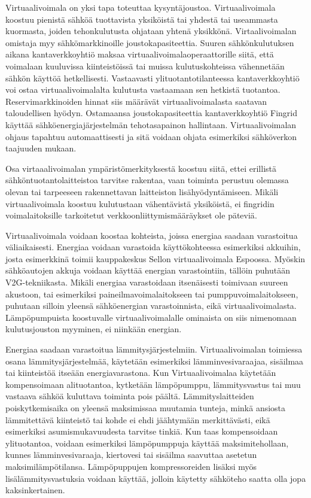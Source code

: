   Virtuaalivoimala on yksi tapa toteuttaa kysyntäjoustoa. Virtuaalivoimala koostuu pienistä sähköä tuottavista yksiköistä tai yhdestä tai useammasta kuormasta, joiden tehonkulutusta ohjataan yhtenä yksikkönä. Virtaalivoimalan omistaja myy sähkömarkkinoille joustokapasiteettia. Suuren sähkönkulutuksen aikana kantaverkkoyhtiö maksaa virtuaalivoimalaoperaattorille siitä, että voimalaan kuuluvissa kiinteistöissä tai muissa kulutuskohteissa vähennetään sähkön käyttöä hetkellisesti. Vastaavasti ylituotantotilanteessa kantaverkkoyhtiö voi ostaa virtuaalivoimalalta kulutusta vastaamaan sen hetkistä tuotantoa. Reservimarkkinoiden hinnat siis määrävät virtuaalivoimalasta saatavan taloudellisen hyödyn. Ostamaansa joustokapasiteettia kantaverkkoyhtiö Fingrid käyttää sähköenergiajärjestelmän tehotasapainon hallintaan. Virtuaalivoimalan ohjaus tapahtuu automaattisesti ja sitä voidaan ohjata esimerkiksi sähköverkon taajuuden mukaan.\parencite{fingrid}

  Osa virtaaalivoimalan ympäristömerkityksestä koostuu siitä, ettei erillistä sähköntuotantolaitteistoa tarvitse rakentaa, vaan toiminta perustuu olemassa olevan tai tarpeeseen rakennettavan laitteiston lisähyödyntämiseen. Mikäli virtuaalivoimala koostuu kulutustaan vähentävistä yksiköistä, ei fingridin voimalaitoksille tarkoitetut verkkoonliittymismääräykset ole päteviä\parencite{VJV2018}.

  Virtuaalivoimala voidaan koostaa kohteista, joissa energiaa saadaan varastoitua väliaikaisesti. Energiaa voidaan varastoida käyttökohteessa esimerkiksi akkuihin, josta esimerkkinä toimii kauppakeskus Sellon virtuaalivoimala Espoossa\parencite{sello}. Myöskin sähköautojen akkuja voidaan käyttää energian varastointiin, tällöin puhutään \gls{V2G}-tekniikasta\parencite{dictOfEnergy}. Mikäli energiaa varastoidaan itsenäisesti toimivaan suureen akustoon, tai esimerkiksi paineilmavoimalaitokseen tai pumppuvoimalaitokseen, puhutaan silloin yleensä sähköenergian varastoinnista, eikä virtuaalivoimalasta\parencite{dictOfEnergy}. Lämpöpumpuista koostuvalle virtuaalivoimalalle ominaista on siis nimenomaan kulutusjouston myyminen, ei niinkään energian.

  Energiaa saadaan varastoitua lämmitysjärjestelmiin. Virtuaalivoimalan toimiessa osana lämmitysjärjestelmää, käytetään esimerkiksi lämminvesivaraajaa, sisäilmaa tai kiinteistöä itseään energiavarastona. Kun Virtuaalivoimalaa käytetään kompensoimaan alituotantoa, kytketään lämpöpumppu, lämmitysvastus tai muu vastaava sähköä kuluttava toiminta pois päältä. Lämmityslaitteiden poiskytkemisaika on yleensä maksimissaa muutamia tunteja, minkä ansiosta lämmitettävä kiinteistö tai kohde ei ehdi jäähtymään merkittävästi, eikä esimerkiksi asumismukavuudesta tarvitse tinkiä. Kun taas kompensoidaan ylituotantoa, voidaan esimerkiksi lämpöpumppuja käyttää maksimitehollaan, kunnes lämminvesivaraaja, kiertovesi tai sisäilma saavuttaa asetetun maksimilämpötilansa. Lämpöpuppujen kompressoreiden lisäksi myös lisälämmitysvastuksia voidaan käyttää, jolloin käytetty sähköteho saatta olla jopa kaksinkertainen.

